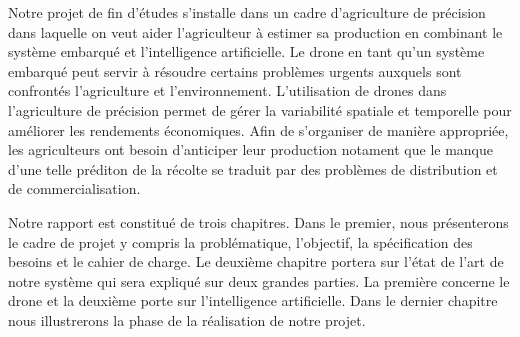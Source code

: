 Notre projet de fin d'études s'installe dans un cadre d'agriculture de précision dans laquelle on veut aider l'agriculteur à estimer sa production en combinant le système embarqué et l'intelligence artificielle. Le drone en tant qu'un système embarqué peut servir à résoudre certains problèmes urgents auxquels sont confrontés l'agriculture et l'environnement. L'utilisation de drones dans l'agriculture de précision permet de gérer la variabilité spatiale et temporelle pour améliorer les rendements économiques. Afin de s'organiser de manière appropriée, les agriculteurs ont besoin d'anticiper leur production notament que le manque d'une telle préditon de la récolte se traduit par des problèmes de distribution et de commercialisation.


Notre rapport est constitué de trois chapitres. Dans le premier, nous présenterons le cadre de projet y compris la problématique, l'objectif, la spécification des besoins et le cahier de charge. Le deuxième chapitre portera sur l'état de l'art de notre système qui sera expliqué sur deux grandes parties. La première concerne le drone et la deuxième porte sur l'intelligence artificielle. Dans le dernier chapitre nous illustrerons la phase de la réalisation de notre projet.


	
	
	
	
	
	
	
